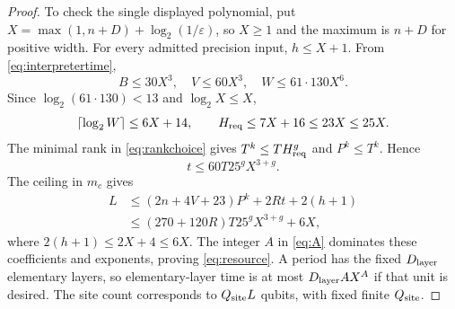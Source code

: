 \begin{proof}
To check the single displayed polynomial, put $X=\max(1,n+D)+\log_2(1/\varepsilon)$, so $X\ge1$ and the maximum is $n+D$ for positive width. For every admitted precision input, $h\le X+1$. From \eqref{eq:interpretertime},
\[
 B\le30X^3,\quad V\le60X^3,\quad W\le61\cdot130X^6.
\]
Since $\log_2(61\cdot130)<13$ and $\log_2X\le X$,
\[
 \lceil\log_2W\rceil\le6X+14,\qquad
 H_{\rm req}\le7X+16\le23X\le25X.
\]
The minimal rank in \eqref{eq:rankchoice} gives $T^k\le T H_{\rm req}^g$ and $P^k\le T^k$. Hence
\[
 t\le60T25^gX^{3+g}.
\]
The ceiling in $m_c$ gives
\[
\begin{split}
 L&\le(2n+4V+23)P^k+2Rt+2(h+1)\\
  &\le(270+120R)T25^gX^{3+g}+6X,
\end{split}
\]
where $2(h+1)\le2X+4\le6X$. The integer $A$ in \eqref{eq:A} dominates these coefficients and exponents, proving \eqref{eq:resource}. A period has the fixed $D_{\rm layer}$ elementary layers, so elementary-layer time is at most $D_{\rm layer}AX^A$ if that unit is desired. The site count corresponds to $Q_{\rm site}L$ qubits, with fixed finite $Q_{\rm site}$.
\end{proof}
